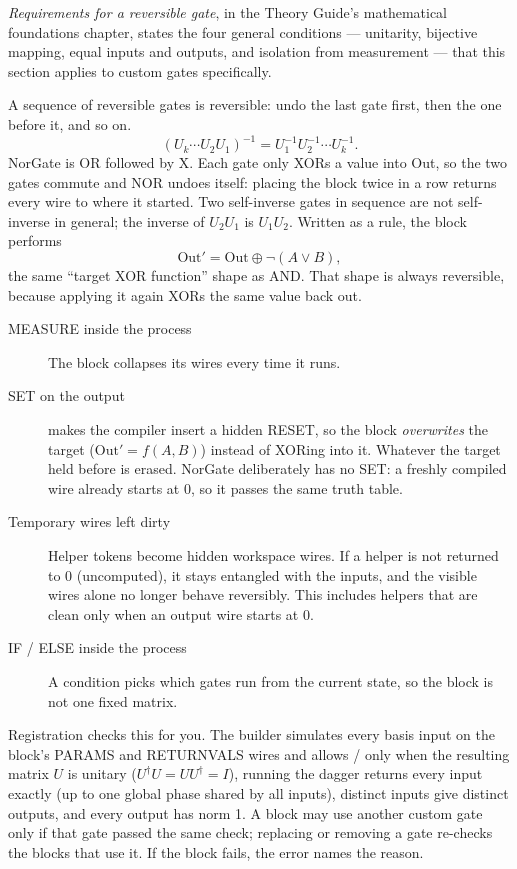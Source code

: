 \emph{Requirements for a reversible gate}, in the Theory Guide's mathematical
foundations chapter, states the four general conditions --- unitarity,
bijective mapping, equal inputs and outputs, and isolation from measurement
--- that this section applies to custom gates specifically.

A sequence of reversible gates is reversible: undo the last gate first, then
the one before it, and so on.
\[
(U_k\cdots U_2U_1)^{-1}=U_1^{-1}U_2^{-1}\cdots U_k^{-1}.
\]
NorGate is OR followed by X. Each gate only XORs a value into Out, so the two
gates commute and NOR undoes itself: placing the block twice in a row returns
every wire to where it started. Two self-inverse gates in sequence are not
self-inverse in general; the inverse of $U_2U_1$ is $U_1U_2$.
Written as a rule, the block performs
\[
\mathrm{Out}'=\mathrm{Out}\oplus\neg(A\lor B),
\]
the same ``target XOR function'' shape as AND. That shape is always
reversible, because applying it again XORs the same value back out.

\begin{cautionbox}
\begin{description}
  \item[MEASURE inside the process] The block collapses its wires every time
  it runs.
  \item[SET on the output]  makes the compiler insert a
  hidden RESET, so the block \emph{overwrites} the target
  ($\mathrm{Out}'=f(A,B)$) instead of XORing into it. Whatever the target held
  before is erased. NorGate deliberately has no SET: a freshly compiled wire
  already starts at 0, so it passes the same truth table.
  \item[Temporary wires left dirty] Helper tokens become hidden workspace
  wires. If a helper is not returned to 0 (uncomputed), it stays entangled
  with the inputs, and the visible wires alone no longer behave reversibly.
  This includes helpers that are clean only when an output wire starts at 0.
  \item[IF / ELSE inside the process] A condition picks which gates run from
  the current state, so the block is not one fixed matrix.
\end{description}
Registration checks this for you. The builder simulates every basis input on
the block's PARAMS and RETURNVALS wires and allows  / 
only when the resulting matrix $U$ is unitary ($U^\dagger U = UU^\dagger = I$),
running the dagger returns every input exactly (up to one global phase shared by
all inputs), distinct inputs give distinct outputs,
and every output has norm 1. A block may use another custom gate only if that
gate passed the same check; replacing or removing a gate re-checks the blocks
that use it. If the block fails, the error names the reason.
\end{cautionbox}

